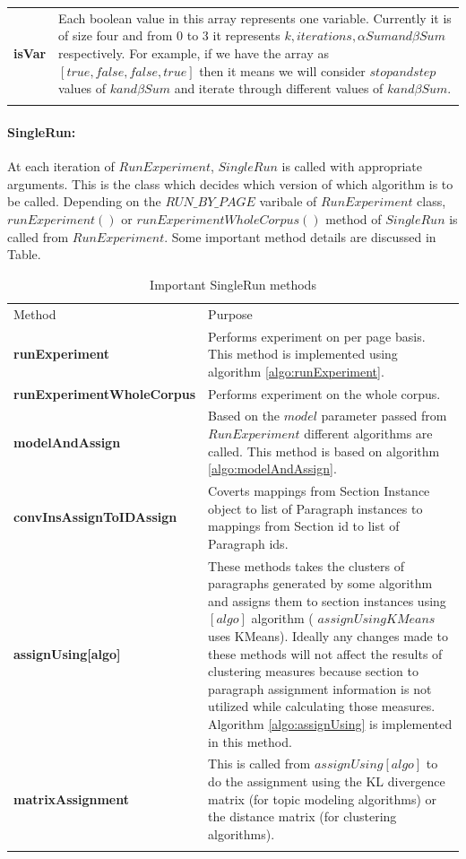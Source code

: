 \begin{table}
\begin{tabular}{l|p{60mm}}
\hline
\textbf{isVar} & Each boolean value in this array represents one variable. Currently it is of size four and from 0 to 3 it represents $ k, iterations, \alpha Sum and \beta Sum$ respectively. For example, if we have the array as $ [true, false, false, true]$ then it means we will consider $ stop and step$ values of $ k and \beta Sum$ and iterate through different values of $ k and \beta Sum$. \\
\noalign{\smallskip}\hline
\end{tabular}
\end{table}
\paragraph{SingleRun: }
At each iteration of $RunExperiment$, $SingleRun$ is called with appropriate arguments. This is the class which decides which version of which algorithm is to be called. Depending on the $RUN\_BY\_PAGE$ varibale of $RunExperiment$ class, $runExperiment()$ or $runExperimentWholeCorpus()$ method of $SingleRun$ is called from $RunExperiment$. Some important method details are discussed in Table.
\begin{table}
\caption{Important SingleRun methods}
\label{tab:iter}       %
\begin{tabular}{l|p{60mm}}
\hline\noalign{\smallskip}
Method & Purpose  \\
\noalign{\smallskip}\hline\noalign{\smallskip}
\textbf{runExperiment} & Performs experiment on per page basis. This method is implemented using algorithm \ref{algo:runExperiment}. \\
\hline
\textbf{runExperimentWholeCorpus} & Performs experiment on the whole corpus. \\
\hline
\textbf{modelAndAssign} & Based on the $model$ parameter passed from $RunExperiment$ different algorithms are called. This method is based on algorithm \ref{algo:modelAndAssign}. \\
\hline
\textbf{convInsAssignToIDAssign} & Coverts mappings from Section Instance object to list of Paragraph instances to mappings from Section id to list of Paragraph ids. \\
\hline
\textbf{assignUsing[algo]} & These methods takes the clusters of paragraphs generated by some algorithm and assigns them to section instances using $[algo]$ algorithm ( $assignUsingKMeans$ uses KMeans). Ideally any changes made to these methods will not affect the results of clustering measures because section to paragraph assignment information is not utilized while calculating those measures. Algorithm \ref{algo:assignUsing} is implemented in this method. \\
\hline
\textbf{matrixAssignment} & This is called from $assignUsing[algo]$ to do the assignment using the KL divergence matrix (for topic modeling algorithms) or the distance matrix (for clustering algorithms). \\
\noalign{\smallskip}\hline
\end{tabular}
\end{table}

